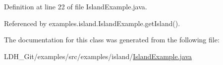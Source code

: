 Definition at line 22 of file Island\-Example.\-java.



Referenced by examples.\-island.\-Island\-Example.\-get\-Island().



The documentation for this class was generated from the following file\-:\begin{DoxyCompactItemize}
\item 
L\-D\-H\-\_\-\-Git/examples/src/examples/island/\hyperlink{_island_example_8java}{Island\-Example.\-java}\end{DoxyCompactItemize}

